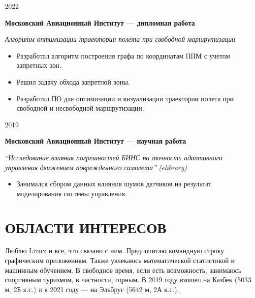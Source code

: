 \documentclass[9pt]{article}
\newcommand{\project}[4]{
    \begin{minipage}[t]{.1\textwidth}
        #1
    \end{minipage}
    \begin{minipage}[t]{.87\textwidth}
        {\bfseries #2}

        \textit{#3}

        \vspace{-1em}

        {#4}
    \end{minipage}
}
\begin{document}
\project
{2022}
{Московский Авиационный Институт — дипломная работа}
{Алгоритм оптимизации траектории полета при свободной маршрутизации}
{
    \begin{itemize}
        \setlength\itemsep{-.5em}
        \item Разработал алгоритм построения графа по координатам ППМ с учетом запретных зон.
        \item Решил задачу обхода запретной зоны.
        \item Разработал ПО для оптимизации и визуализации траектории полета при свободной и несвободной маршрутизации.
    \end{itemize}
}

\project
{2019}
{Московский Авиационный Институт — научная работа}
{“Исследование влияния погрешностей БИНС на точность адаптивного управления движением поврежденного самолета” (elibrary)}
{
    \begin{itemize}
        \setlength\itemsep{-.5em}
        \item Занимался сбором данных влияния шумов датчиков на результат моделирования системы управления.
    \end{itemize}
}


\section{ОБЛАСТИ ИНТЕРЕСОВ}

Люблю Linux и все, что связано с ним. Предпочитаю командную строку графическим приложениям.
Также увлекаюсь математической статистикой и машинным обучением.
В свободное время, если есть возможность, занимаюсь спортивным туризмом, в частности, горным. В 2019 году
взошел на Казбек (5033 м, 2Б к.с.) и в 2021 году — на Эльбрус (5642 м, 2А к.с.).
\end{document}

